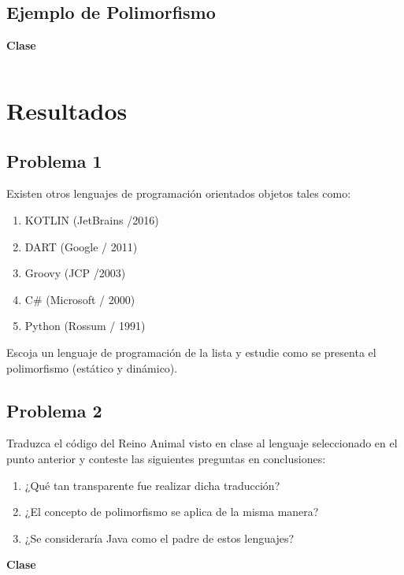 \documentclass[11pt, twocolumn]{article}
\begin{document}
  \subsection*{Ejemplo de Polimorfismo}
  \textbf{Clase \textit{}} 
  \begin{lstlisting}

  \end{lstlisting}

  \section*{Resultados}
  \subsection*{Problema 1}
  Existen otros lenguajes de programación orientados objetos tales como:

  \begin{enumerate}[label=\alph*.]
    \item KOTLIN (JetBrains /2016)
    \item DART (Google / 2011)
    \item Groovy (JCP /2003)
    \item C$\#$ (Microsoft / 2000)
    \item Python (Rossum / 1991)
  \end{enumerate}
  
  Escoja un lenguaje de programación de la lista y estudie como se presenta el polimorfismo (estático y dinámico).

  \subsection*{Problema 2}
  Traduzca el código del Reino Animal visto en clase al lenguaje seleccionado en el punto anterior y conteste las siguientes preguntas en conclusiones:

  \begin{enumerate}[label=\alph*.]
    \item ¿Qué tan transparente fue realizar dicha traducción?
    \item ¿El concepto de polimorfismo se aplica de la misma manera?
    \item ¿Se consideraría Java como el padre de estos lenguajes?
  \end{enumerate}

  \textbf{Clase \textit{}}
  \begin{lstlisting}

  \end{lstlisting}  
  
\end{document}
